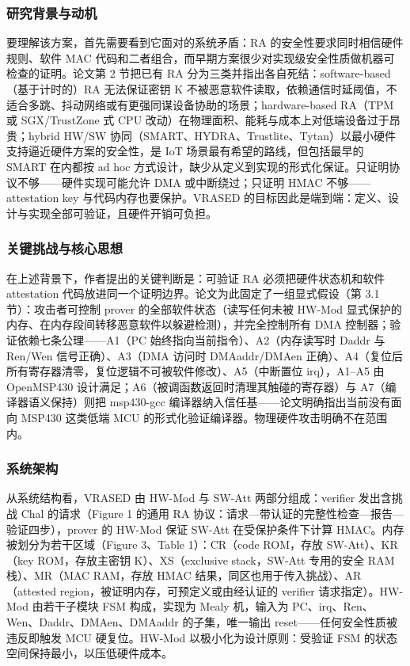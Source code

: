 \documentclass[11pt]{ctexart}
\begin{document}
\subsubsection{研究背景与动机}
要理解该方案，首先需要看到它面对的系统矛盾：RA 的安全性要求同时相信硬件规则、软件 MAC 代码和二者组合，而早期方案很少对实现级安全性质做机器可检查的证明。论文第 2 节把已有 RA 分为三类并指出各自死结：software-based（基于计时的）RA 无法保证密钥 K 不被恶意软件读取，依赖通信时延阈值，不适合多跳、抖动网络或有更强同谋设备协助的场景；hardware-based RA（TPM 或 SGX/TrustZone 式 CPU 改动）在物理面积、能耗与成本上对低端设备过于昂贵；hybrid HW/SW 协同（SMART、HYDRA、Trustlite、Tytan）以最小硬件支持逼近硬件方案的安全性，是 IoT 场景最有希望的路线，但包括最早的 SMART 在内都按 ad hoc 方式设计，缺少从定义到实现的形式化保证。只证明协议不够——硬件实现可能允许 DMA 或中断绕过；只证明 HMAC 不够——attestation key 与代码内存也要保护。VRASED 的目标因此是端到端：定义、设计与实现全部可验证，且硬件开销可负担。\par
\subsubsection{关键挑战与核心思想}
在上述背景下，作者提出的关键判断是：可验证 RA 必须把硬件状态机和软件 attestation 代码放进同一个证明边界。论文为此固定了一组显式假设（第 3.1 节）：攻击者可控制 prover 的全部软件状态（读写任何未被 HW-Mod 显式保护的内存、在内存段间转移恶意软件以躲避检测），并完全控制所有 DMA 控制器；验证依赖七条公理——A1（PC 始终指向当前指令）、A2（内存读写时 Daddr 与 Ren/Wen 信号正确）、A3（DMA 访问时 DMAaddr/DMAen 正确）、A4（复位后所有寄存器清零，复位逻辑不可被软件修改）、A5（中断置位 irq），A1–A5 由 OpenMSP430 设计满足；A6（被调函数返回时清理其触碰的寄存器）与 A7（编译器语义保持）则把 msp430-gcc 编译器纳入信任基——论文明确指出当前没有面向 MSP430 这类低端 MCU 的形式化验证编译器。物理硬件攻击明确不在范围内。\par
\subsubsection{系统架构}
从系统结构看，VRASED 由 HW-Mod 与 SW-Att 两部分组成：verifier 发出含挑战 Chal 的请求（Figure 1 的通用 RA 协议：请求—带认证的完整性检查—报告—验证四步），prover 的 HW-Mod 保证 SW-Att 在受保护条件下计算 HMAC。内存被划分为若干区域（Figure 3、Table 1）：CR（code ROM，存放 SW-Att）、KR（key ROM，存放主密钥 K）、XS（exclusive stack，SW-Att 专用的安全 RAM 栈）、MR（MAC RAM，存放 HMAC 结果，同区也用于传入挑战）、AR（attested region，被证明内存，可预定义或由经认证的 verifier 请求指定）。HW-Mod 由若干子模块 FSM 构成，实现为 Mealy 机，输入为 PC、irq、Ren、Wen、Daddr、DMAen、DMAaddr 的子集，唯一输出 reset——任何安全性质被违反即触发 MCU 硬复位。HW-Mod 以极小化为设计原则：受验证 FSM 的状态空间保持最小，以压低硬件成本。\par
\end{document}
